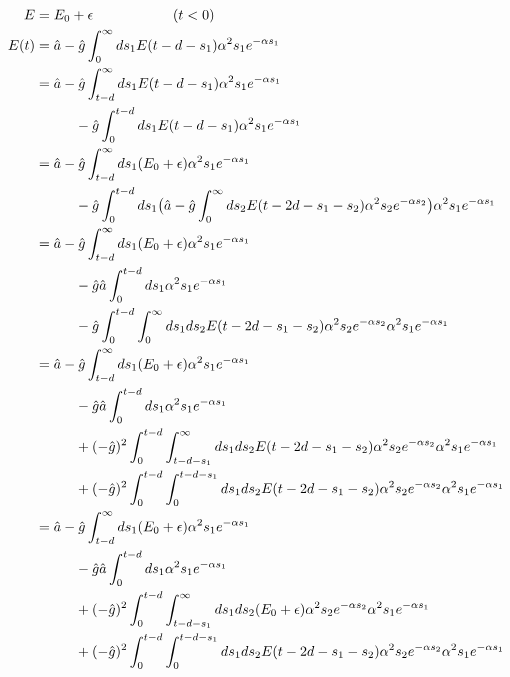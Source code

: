 \begin{align}
	E &= E_0 + \epsilon \hspace{2cm} (t<0) \\
	E(t) &= \hat{a} - \hat{g} \int_{0}^{\infty} ds_1 E(t - d - s_1) \alpha^2 s_1 e^{-\alpha s_1} \\
	&= \hat{a} - \hat{g} \int_{t - d}^{\infty} ds_1 E(t - d - s_1) \alpha^2 s_1 e^{-\alpha s_1} \\
	&\hspace{1 cm} - \hat{g} \int_{0}^{t - d} ds_1 E(t - d - s_1) \alpha^2 s_1 e^{-\alpha s_1} \\
	&= \hat{a} - \hat{g} \int_{t - d}^{\infty} ds_1 ( E_0 + \epsilon ) \alpha^2 s_1 e^{-\alpha s_1}\\
	& \hspace{1 cm} - \hat{g} \int_{0}^{t - d} ds_1 \big( \hat{a} - \hat{g} \int_{0}^{\infty} ds_2 E(t - 2d - s_1 - s_2) \alpha^2 s_2 e^{-\alpha s_2} \big) \alpha^2 s_1 e^{-\alpha s_1} \\
	&= \hat{a} - \hat{g} \int_{t - d}^{\infty} ds_1 ( E_0 + \epsilon ) \alpha^2 s_1 e^{-\alpha s_1}\\
	& \hspace{1 cm} - \hat{g} \hat{a} \int_{0}^{t - d} ds_1 \alpha^2 s_1 e^{-\alpha s_1}\\
	& \hspace{1 cm} - \hat{g} \int_{0}^{t - d} \int_{0}^{\infty} ds_1 ds_2 E(t - 2d - s_1 - s_2) \alpha^2 s_2 e^{-\alpha s_2} \alpha^2 s_1 e^{-\alpha s_1} \\
	&= \hat{a} - \hat{g} \int_{t - d}^{\infty} ds_1 ( E_0 + \epsilon ) \alpha^2 s_1 e^{-\alpha s_1}\\
	& \hspace{1 cm} - \hat{g} \hat{a} \int_{0}^{t - d} ds_1 \alpha^2 s_1 e^{-\alpha s_1}\\
	& \hspace{1 cm} + (-\hat{g})^2 \int_{0}^{t-d} \int_{t - d - s_1}^{\infty} ds_1 ds_2 E(t - 2d - s_1 - s_2) \alpha^2 s_2 e^{-\alpha s_2} \alpha^2 s_1 e^{-\alpha s_1} \\
	& \hspace{1 cm} + (-\hat{g})^2 \int_{0}^{t - d} \int_{0}^{t - d - s_1} ds_1 ds_2 E(t - 2d - s_1 - s_2) \alpha^2 s_2 e^{-\alpha s_2} \alpha^2 s_1 e^{-\alpha s_1} \\
	&= \hat{a} - \hat{g} \int_{t - d}^{\infty} ds_1 ( E_0 + \epsilon ) \alpha^2 s_1 e^{-\alpha s_1}\\
	& \hspace{1 cm} - \hat{g} \hat{a} \int_{0}^{t - d} ds_1 \alpha^2 s_1 e^{-\alpha s_1}\\
	& \hspace{1 cm} +(-\hat{g})^2 \int_{0}^{t-d} \int_{t - d - s_1}^{\infty} ds_1 ds_2 (E_0 + \epsilon) \alpha^2 s_2 e^{-\alpha s_2} \alpha^2 s_1 e^{-\alpha s_1} \\
	& \hspace{1 cm} +(-\hat{g})^2 \int_{0}^{t - d} \int_{0}^{t - d - s_1} ds_1 ds_2 E(t - 2d - s_1 - s_2) \alpha^2 s_2 e^{-\alpha s_2} \alpha^2 s_1 e^{-\alpha s_1}
\end{align}

